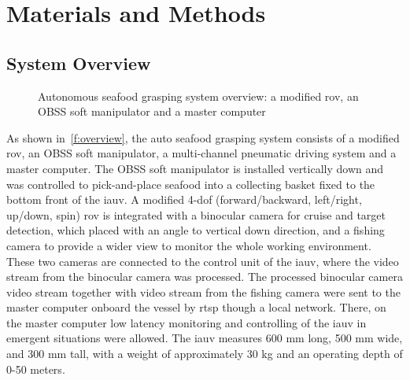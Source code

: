 \section{Materials and Methods}\label{s:3}

\subsection{System Overview}

\begin{figure}[htb]
    \caption[Autonomous seafood grasping system overview]{Autonomous seafood
        grasping system overview: a modified \gls{rov}, an \gls{OBSS} soft
        manipulator and a master computer}\label{f:overview}
\end{figure}

As shown in~\autoref{f:overview}, the auto seafood grasping system consists of a
modified \gls{rov}, an \gls{OBSS} soft manipulator, a multi-channel pneumatic
driving system and a master computer. The \gls{OBSS} soft manipulator is
installed vertically down and was controlled to pick-and-place seafood into a
collecting basket fixed to the bottom front of the \gls{iauv}. A modified
4-\gls{dof} (forward/backward, left/right, up/down, spin) \gls{rov} is
integrated with a binocular camera  for cruise and target
detection, which placed with an angle to vertical down direction, and a fishing
camera to provide a wider view to monitor the whole working environment. These
two cameras are connected to the control unit of the \gls{iauv}, where the video
stream from the binocular camera was processed. The processed binocular camera
video stream together with video stream from the fishing camera were sent to the
master computer onboard the vessel by \gls{rtsp} though a local network. There,
on the master computer low latency monitoring and controlling of the \gls{iauv}
in emergent situations were allowed. The \gls{iauv} measures 600 mm long, 500 mm
wide, and 300 mm tall, with a weight of approximately 30 kg and an operating
depth of 0{-}50 meters.

